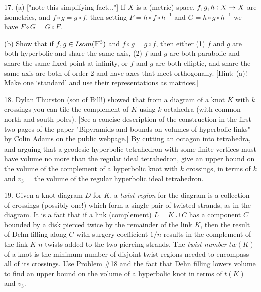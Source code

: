 \documentclass[12pt]{article}
\begin{document}
\begin{description}


\item{17.} (a) ["note this simplifying fact..."] If $X$ is a (metric) space, $f,g,h:X\rightarrow X$ 
are isometries, and $f\circ g=g\circ f$, then setting $F=h\circ f\circ h^{-1}$ and 
$G=h\circ g\circ h^{-1}$ we have $F\circ G=G\circ F$.

\item{\spc} (b) Show that if $f,g\in Isom({\mathbb H}^3)$ and $f\circ g=g\circ f$, then either
(1) $f$ and $g$ are both hyperbolic and share the same axis, (2) $f$ and $g$ are both parabolic
and share the same fixed point at infinity, or $f$ and $g$ are both elliptic, and  
share the same axis  are both of order 2 and have axes that meet orthogonally.
[Hint: (a)! Make one `standard' and use their representations as matrices.]

\item{18.} Dylan Thurston (son of Bill!) showed that from a diagram of a knot $K$ with $k$ crossings 
you can tile the complement of $K$ using $k$ octahedra (with common north and south poles).
[See a concise description of the construction in the first two pages of the paper 
"Bipyramids and bounds on volumes of hyperbolic 
links" by Colin Adams on the public webpage.] By cutting an octagon into tetrahedra, 
and arguing that a geodesic hyperbolic tetrahedron with some finite vertices must have 
volume no more than the regular ideal tetrahedron, give an upper bound on the volume of 
the complement of a hyperbolic knot with $k$ crossings, in terms of $k$ and $v_3$ = the
volume of the regular hyperbolic ideal tetrahedron.

\item{19.} Given a knot diagram $D$ for $K$, a {\it twist region} for the diagram is a 
collection of crossings (possibly one!) which form a single pair of twisted strands, as in the diagram.
It is a fact that if a link (complement) $L=K\cup C$ has a component $C$ bounded by a disk pierced twice by the 
remainder of the link $K$, then the result of Dehn filling along $C$ with surgery coefficient 
$1/n$ results in the complement of the link $K$  $n$  twists added to the 
two piercing strands. The {\it twist number} $tw(K)$ of a knot is the minimum number of disjoint
twist regions needed to encompass all of its crossings. Use Problem \#18 and the fact that Dehn filling
lowers volume to find an upper bound on the volume of a hyperbolic knot in terms of $t(K)$ and $v_3$.



\end{description}
\end{document}
